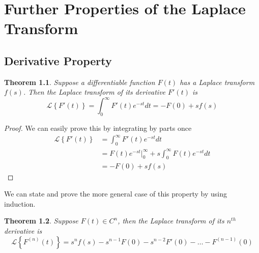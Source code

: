 \documentclass{report}
\newtheorem{theorem}{Theorem}[chapter]
\theoremstyle{definition}
\theoremstyle{remark}
\newcommand{\lapt}[1]{\mathscr{L}\left\{ #1\right\}}
\begin{document}
\chapter{Further Properties of the Laplace Transform}
\section{Derivative Property}
\begin{theorem}
    Suppose a differentiable function $F(t)$ has a Laplace transform $f(s)$. Then the Laplace transform of its derivative $F'(t)$ is 
    \begin{equation*}
        \lapt{F'(t)} = \int^\infty_0F'(t)e^{-st}dt = -F(0) + sf(s)  \label{theo:2.1}
    \end{equation*}
\end{theorem}
\begin{proof}
    We can easily prove this by integrating by parts once 
    \begin{equation*}
        \begin{split}
            \lapt{F'(t)} &= \int^\infty_0 F'(t) e^{-st} dt \\
            &= F(t)e^{-st}\Big|^\infty_0 +s\int^\infty_0F(t)e^{-st}dt \\
            &= -F(0) + sf(s)
        \end{split}
    \end{equation*}
\end{proof}
We can state and prove the more general case of this property by using induction.
\begin{theorem}
    Suppose $F(t) \in C^n$, then the Laplace transform of its $n^{th}$ derivative is 
    \begin{equation}
        \lapt{F^{(n)}(t)}  = s^nf(s) -s^{n-1}F(0)-s^{n-2}F'(0) -\ldots-F^{(n-1)}(0) \label{eq:2.1}
    \end{equation}
\end{theorem}
\end{document}
